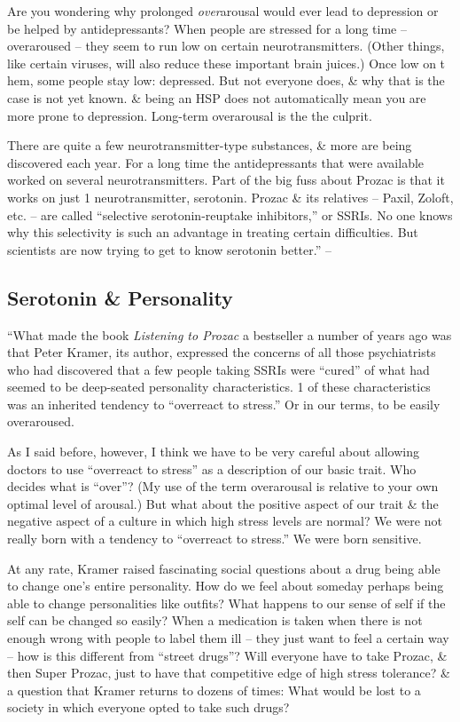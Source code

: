\documentclass{article}
\numberwithin{equation}{section}
\begin{document}
Are you wondering why prolonged \textit{over}arousal would ever lead to depression or be helped by antidepressants? When people are stressed for a long time -- overaroused -- they seem to run low on certain neurotransmitters. (Other things, like certain viruses, will also reduce these important brain juices.) Once low on t hem, some people stay low: depressed. But not everyone does, \& why that is the case is not yet known. \& being an HSP does not automatically mean you are more prone to depression. Long-term overarousal is the the culprit.

There are quite a few neurotransmitter-type substances, \& more are being discovered each year. For a long time the antidepressants that were available worked on several neurotransmitters. Part of the big fuss about Prozac is that it works on just 1 neurotransmitter, serotonin. Prozac \& its relatives -- Paxil, Zoloft, etc. -- are called ``selective serotonin-reuptake inhibitors,'' or SSRIs. No one knows why this selectivity is such an advantage in treating certain difficulties. But scientists are now trying to get to know serotonin better.'' -- \cite[p. 229--231]{Aron2013}

\subsection{Serotonin \& Personality}
``What made the book \textit{Listening to Prozac} a bestseller a number of years ago was that Peter Kramer, its author, expressed the concerns of all those psychiatrists who had discovered that a few people taking SSRIs were ``cured'' of what had seemed to be deep-seated personality characteristics. 1 of these characteristics was an inherited tendency to ``overreact to stress.'' Or in our terms, to be easily overaroused.

As I said before, however, I think we have to be very careful about allowing doctors to use ``overreact to stress'' as a description of our basic trait. Who decides what is ``over''? (My use of the term overarousal is relative to your own optimal level of arousal.) But what about the positive aspect of our trait \& the negative aspect of a culture in which high stress levels are normal? We were not really born with a tendency to ``overreact to stress.'' We were born sensitive.

At any rate, Kramer raised fascinating social questions about a drug being able to change one's entire personality. How do we feel about someday perhaps being able to change personalities like outfits? What happens to our sense of self if the self can be changed so easily? When a medication is taken when there is not enough wrong with people to label them ill -- they just want to feel a certain way -- how is this different from ``street drugs''? Will everyone have to take Prozac, \& then Super Prozac, just to have that competitive edge of high stress tolerance? \& a question that Kramer returns to dozens of times: What would be lost to a society in which everyone opted to take such drugs?
\end{document}
